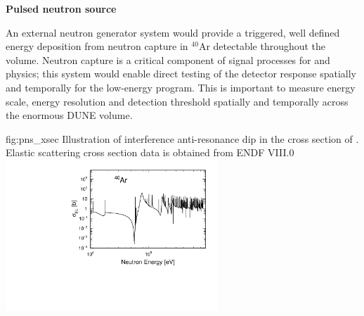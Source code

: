 \textbf{Pulsed neutron source} 

An external neutron generator system would provide a triggered, well defined energy deposition from neutron capture in $^{40}$Ar detectable throughout the  volume. Neutron capture is a critical component of signal processes for  and  physics; this system would enable direct testing of the detector response  spatially and temporally for the low-energy program.  This is important to measure energy scale, energy resolution and detection threshold spatially and temporally across the enormous DUNE volume.

\begin{dunefigure}{fig:pns_xsec}
{Illustration of interference anti-resonance dip in the cross section of  . Elastic scattering cross section data is obtained from ENDF VIII.0}
\includegraphics[width=8cm]{graphics/Calib_pns_ES_xsec_Ar40.pdf}
\end{dunefigure}

